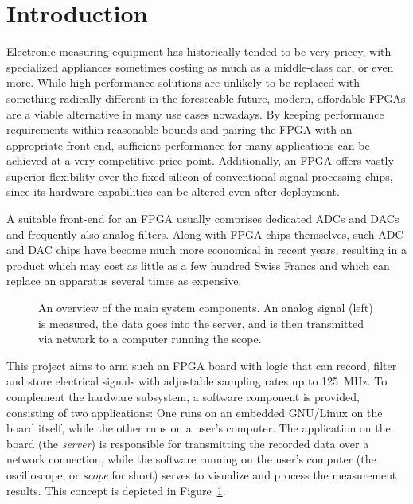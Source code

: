 %
%
\chapter*{Introduction} %
\label{ch:intro}

Electronic measuring equipment has historically tended to be very pricey, with
specialized appliances  sometimes costing  as much as  a middle-class  car, or
even more. While high-performance  solutions are unlikely to  be replaced with
something radically  different in  the foreseeable future,  modern, affordable
FPGAs  are  a  viable  alternative  in many  use  cases  nowadays. By  keeping
performance requirements within reasonable bounds and pairing the FPGA with an
appropriate  front-end, sufficient  performance for  many applications  can be
achieved  at a  very competitive  price point.   Additionally, an  FPGA offers
vastly  superior flexibility  over the  fixed silicon  of conventional  signal
processing chips,  since its hardware  capabilities can be altered  even after
deployment.

A suitable front-end for an FPGA usually comprises dedicated ADCs and DACs and
frequently also analog filters. Along with FPGA chips themselves, such ADC and
DAC chips  have become much  more economical in  recent years, resulting  in a
product which may cost  as little as a few hundred Swiss  Francs and which can
replace an apparatus several times as expensive.

\makeatletter
\renewcommand{\thefigure}{\@arabic\c@figure}
\makeatother
\begin{figure}[ht]
    \centering
    
    \caption[System Overview]{%
        An overview of the main system components.  An analog signal (left) is
        measured, the data  goes into the server, and is  then transmitted via
        network to a computer running the scope.%
    }
    \label{fig:intro:system_overview}
\end{figure}
\makeatletter
\renewcommand{\thefigure}{\thechapter.\@arabic\c@figure}
\makeatother

This  project aims  to arm  such an  FPGA board  with logic  that can  record,
filter  and store  electrical signals  with  adjustable sampling  rates up  to
\SI{125}{\mega\hertz}.   To  complement  the hardware  subsystem,  a  software
component is provided, consisting of two applications: One runs on an embedded
GNU/Linux on the board itself, while  the other runs on a user's computer. The
application on the  board (the \emph{server}) is  responsible for transmitting
the recorded data over a network connection, while the software running on the
user's  computer  (the oscilloscope,  or  \emph{scope}  for short)  serves  to
visualize and  process the  measurement results. This  concept is  depicted in
Figure~\ref{fig:intro:system_overview}.

